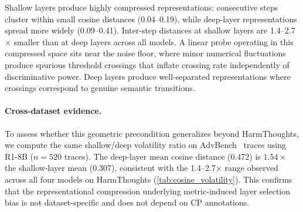 \begin{table}[htbp]
\centering
\small
\caption{Step-to-step cosine distance at shallow and threshold-based (deep) layers. Shallow layers produce highly compressed representations (1.4--2.7$\times$ smaller inter-step distances). Shallow layers are L2 for R1-8B/OT-7B/QwQ-32B and L10 for R1-32B; deep layers follow threshold-based consensus (\cref{tab:layer_selection}).}
\label{tab:cosine_volatility}
\end{table}

Shallow layers produce highly compressed representations: consecutive steps cluster within small cosine distances (0.04--0.19), while deep-layer representations spread more widely (0.09--0.41). Inter-step distances at shallow layers are 1.4--2.7$\times$ smaller than at deep layers across all models. A linear probe operating in this compressed space sits near the noise floor, where minor numerical fluctuations produce spurious threshold crossings that inflate crossing rate independently of discriminative power. Deep layers produce well-separated representations where crossings correspond to genuine semantic transitions.

\paragraph{Cross-dataset evidence.}
To assess whether this geometric precondition generalizes beyond HarmThoughts, we compute the same shallow/deep volatility ratio on AdvBench~\citep{advbench} traces using R1-8B ($n{=}520$ traces). The deep-layer mean cosine distance (0.472) is $1.54\times$ the shallow-layer mean (0.307), consistent with the 1.4--2.7$\times$ range observed across all four models on HarmThoughts (\cref{tab:cosine_volatility}). This confirms that the representational compression underlying metric-induced layer selection bias is not dataset-specific and does not depend on CP annotations.

